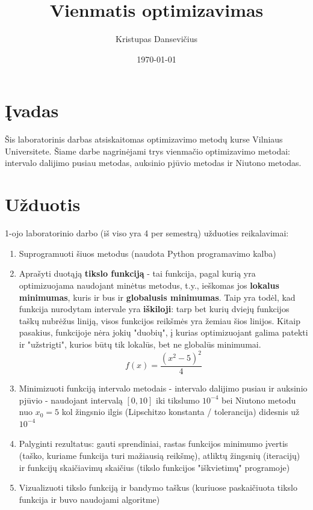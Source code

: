 \documentclass[lithuanian,a4paper,12pt]{article}
\title{Vienmatis optimizavimas}
\author{Kristupas Dansevičius}
\date{\today}
\begin{document}
\maketitle
\tableofcontents

\section{Įvadas}
Šis laboratorinis darbas atsiskaitomas optimizavimo metodų kurse Vilniaus Universitete. 
Šiame darbe nagrinėjami trys vienmačio optimizavimo metodai:
intervalo dalijimo pusiau metodas, auksinio pjūvio metodas ir Niutono metodas. 

\section{Užduotis}
1-ojo laboratorinio darbo (iš viso yra 4 per semestrą) užduoties reikalavimai:
\begin{enumerate}
    \item Suprogramuoti šiuos metodus (naudota Python programavimo kalba)
    \item Aprašyti duotąją \textbf{tikslo funkciją} - tai funkcija, pagal kurią yra optimizuojama naudojant minėtus metodus, t.y., ieškomas jos \textbf{lokalus minimumas}, kuris ir bus ir \textbf{globalusis minimumas}. Taip yra todėl, kad funkcija nurodytam intervale yra \textbf{iškiloji}: tarp bet kurių dviejų funkcijos taškų nubrėžus liniją, visos funkcijos reikšmės yra žemiau šios linijos. Kitaip pasakius, funkcijoje nėra jokių "duobių", į kurias optimizuojant galima patekti ir "užstrigti", kurios būtų tik lokalūs, bet ne globalūs minimumai.  
        \begin{equation}
            f(x) = \frac{(x^2 - 5)^2}{4}
        \end{equation}
    \item Minimizuoti funkciją intervalo metodais - intervalo dalijimo pusiau ir auksinio pjūvio - naudojant intervalą $[0,10]$ iki tikslumo $10^{-4}$ bei Niutono metodu nuo $x_0 = 5$ kol žingsnio ilgis (Lipschitzo konstanta / tolerancija) didesnis už $10^{-4}$
    \item Palyginti rezultatus: gauti sprendiniai, rastas funkcijos minimumo įvertis (taško, kuriame funkcija turi mažiausią reikšmę), atliktų žingsnių (iteracijų) ir funkcijų skaičiavimų skaičius (tikslo funkcijos "iškvietimų" programoje)
    \item Vizualizuoti tikslo funkciją ir bandymo taškus (kuriuose paskaičiuota tikslo funkcija ir buvo naudojami algoritme)
\end{enumerate}
\end{document}
